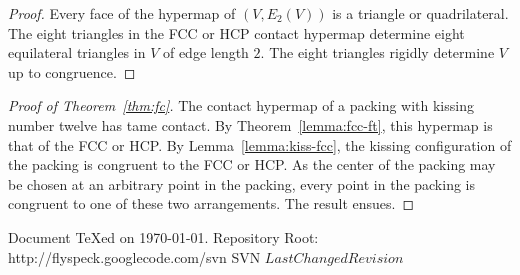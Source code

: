 \documentclass{llncs}
\def\svninfo{{\tt
  filename: turing.tex\hfill\break
  PDF generated from LaTeX sources on \today; \hfill\break
  Repository Root: https://flyspeck.googlecode.com/svn \hfill\break
  SVN $LastChangedRevision$
  }
  }
\def\svninfo{%
  \noindent
  Document TeXed on \today. \hfill\break
  Repository Root: http://flyspeck.googlecode.com/svn \hfill\break
  SVN $LastChangedRevision$\hfill\break
  }
\begin{document}
\begin{proof} Every face of the hypermap of $(V,E_2(V))$ is a
  triangle or quadrilateral.  The eight triangles in the FCC or HCP
  contact hypermap determine eight equilateral triangles in $V$ of
  edge length $2$.  The eight triangles rigidly determine $V$ up to
  congruence.
\end{proof}

\begin{proof}[Proof of Theorem~\ref{thm:fc}]  %
  The contact hypermap of a packing with kissing number twelve has tame
  contact.  By Theorem~\ref{lemma:fcc-ft}, this hypermap is that of
  the FCC or HCP.  By Lemma~\ref{lemma:kiss-fcc}, the kissing
  configuration of the packing is congruent to the FCC or HCP.  As the
  center of the packing may be chosen at an arbitrary point in the
  packing, every point in the packing is congruent to one of these two
  arrangements.  The result ensues.
\end{proof}





\raggedright



\newpage
\bigskip
\noindent
\svninfo
\smallskip

\noindent
\endnote
\end{document}
